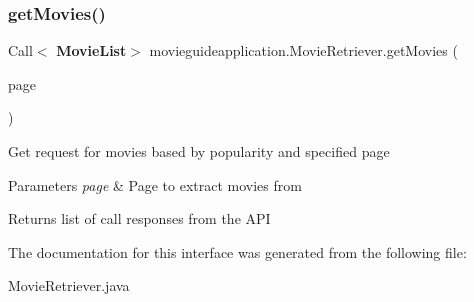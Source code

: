\subsubsection{get\+Movies()\hspace{0.1cm}{\footnotesize\ttfamily [2/2]}}
{\footnotesize\ttfamily Call$<$\textbf{ Movie\+List}$>$ movieguideapplication.\+Movie\+Retriever.\+get\+Movies (\begin{DoxyParamCaption}\item[{@Query(\char`\"{}page\char`\"{}) int}]{page }\end{DoxyParamCaption})}

Get request for movies based by popularity and specified page 
\begin{DoxyParams}{Parameters}
{\em page} & Page to extract movies from \\
\hline
\end{DoxyParams}
\begin{DoxyReturn}{Returns}
list of call responses from the A\+PI 
\end{DoxyReturn}


The documentation for this interface was generated from the following file\+:\begin{DoxyCompactItemize}
\item 
Movie\+Retriever.\+java\end{DoxyCompactItemize}
